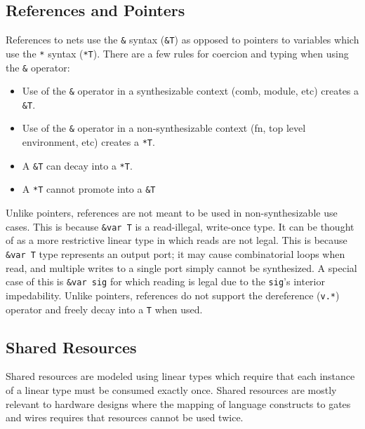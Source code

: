 \documentclass[10pt]{article}
\begin{document}
\subsection{References and Pointers}
References to nets use the \verb|&| syntax (\verb|&T|) as opposed to pointers to variables which use
the \verb|*| syntax (\verb|*T|). There are a few rules for coercion and typing when using the
\verb|&| operator:

\begin{itemize}
	\item Use of the \verb|&| operator in a synthesizable context (comb, module, etc) creates a \verb|&T|.
	\item Use of the \verb|&| operator in a non-synthesizable context (fn, top level environment, etc) creates a \verb|*T|.
	\item A \verb|&T| can decay into a \verb|*T|.
	\item A \verb|*T| cannot promote into a \verb|&T|
\end{itemize}

Unlike pointers, references are not meant to be used in non-synthesizable use cases. This is because
\verb|&var T| is a read-illegal, write-once type. It can be thought of as a more restrictive linear
type in which reads are not legal. This is because \verb|&var T| type represents an output port; it
may cause combinatorial loops when read, and multiple writes to a single port simply cannot be
synthesized. A special case of this is \verb|&var sig| for which reading is legal due to the
\verb|sig|'s interior impedability. Unlike pointers, references do not support the dereference
(\verb|v.*|) operator and freely decay into a \verb|T| when used.


\subsection{Shared Resources} \label{sec:shared_res}
Shared resources are modeled using linear types which require that each instance of a linear type
must be consumed exactly once. Shared resources are mostly relevant to hardware designs where the
mapping of language constructs to gates and wires requires that resources cannot be used twice.
\end{document}
